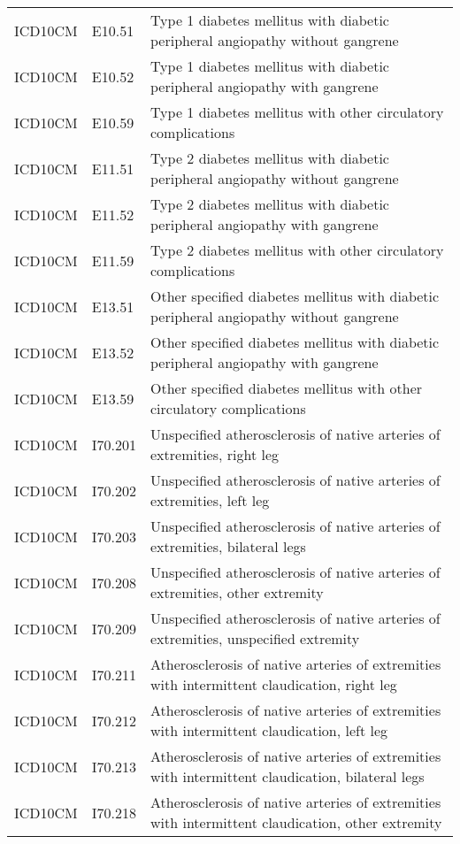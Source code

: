 \begin{longtable}{p{}p{}p{}}
  ICD10CM & E10.51 & Type 1 diabetes mellitus with diabetic peripheral angiopathy without gangrene \\ 
  ICD10CM & E10.52 & Type 1 diabetes mellitus with diabetic peripheral angiopathy with gangrene \\ 
  ICD10CM & E10.59 & Type 1 diabetes mellitus with other circulatory complications \\ 
  ICD10CM & E11.51 & Type 2 diabetes mellitus with diabetic peripheral angiopathy without gangrene \\ 
  ICD10CM & E11.52 & Type 2 diabetes mellitus with diabetic peripheral angiopathy with gangrene \\ 
  ICD10CM & E11.59 & Type 2 diabetes mellitus with other circulatory complications \\ 
  ICD10CM & E13.51 & Other specified diabetes mellitus with diabetic peripheral angiopathy without gangrene \\ 
  ICD10CM & E13.52 & Other specified diabetes mellitus with diabetic peripheral angiopathy with gangrene \\ 
  ICD10CM & E13.59 & Other specified diabetes mellitus with other circulatory complications \\ 
  ICD10CM & I70.201 & Unspecified atherosclerosis of native arteries of extremities, right leg \\ 
  ICD10CM & I70.202 & Unspecified atherosclerosis of native arteries of extremities, left leg \\ 
  ICD10CM & I70.203 & Unspecified atherosclerosis of native arteries of extremities, bilateral legs \\ 
  ICD10CM & I70.208 & Unspecified atherosclerosis of native arteries of extremities, other extremity \\ 
  ICD10CM & I70.209 & Unspecified atherosclerosis of native arteries of extremities, unspecified extremity \\ 
  ICD10CM & I70.211 & Atherosclerosis of native arteries of extremities with intermittent claudication, right leg \\ 
  ICD10CM & I70.212 & Atherosclerosis of native arteries of extremities with intermittent claudication, left leg \\ 
  ICD10CM & I70.213 & Atherosclerosis of native arteries of extremities with intermittent claudication, bilateral legs \\ 
  ICD10CM & I70.218 & Atherosclerosis of native arteries of extremities with intermittent claudication, other extremity \\ 

\end{longtable}
